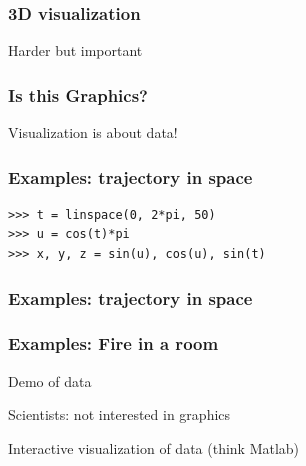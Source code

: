 \begin{frame}
    \frametitle{3D visualization}
    \Large
    \begin{center}
        Harder but important
    \end{center}
\end{frame}

\begin{frame}
    \frametitle{Is this Graphics?}
    \Large
    \begin{center}
        Visualization is about data!
    \end{center}
\end{frame}

\begin{frame}[fragile]
    \frametitle{Examples: trajectory in space}
    \Large
\begin{lstlisting}
>>> t = linspace(0, 2*pi, 50)
>>> u = cos(t)*pi
>>> x, y, z = sin(u), cos(u), sin(t)
\end{lstlisting}
\end{frame}

\begin{frame}
    \frametitle{Examples: trajectory in space}
    \Large
    \begin{center}
    \end{center}
\end{frame}

\begin{frame}
    \frametitle{Examples: Fire in a room}
    \Large
    \begin{center}
        Demo of data
    \end{center}
\end{frame}

\begin{frame}
\end{frame}

\begin{frame}
    \Large
    \begin{center}
  Scientists: not interested in graphics

    \end{center}
\end{frame}

\begin{frame}
    \Large
    \begin{center}
   Interactive visualization of data (think Matlab)
    \end{center}
\end{frame}

